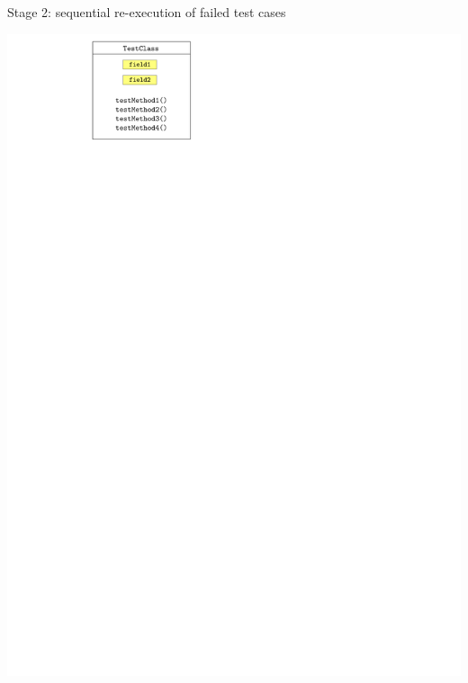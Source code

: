 \documentclass{beamer}
\begin{document}
\begin{frame}{Stage 2: sequential re-execution of failed test cases}
	\begin{center}
		\begin{minipage}{0.48\linewidth}
			\centering
			\includegraphics[width=0.85\linewidth,page=1]{images/flakes.pdf}
		\end{minipage}%
		\hfill
		\begin{minipage}{0.48\linewidth}
			\centering

\end{minipage}
\end{center}
\end{frame}
\end{document}
